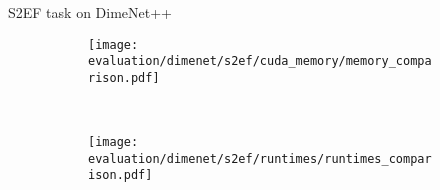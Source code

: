 \begin{frame}{S2EF task on DimeNet++}
    
    \begin{figure}[H]
        \centering
    
        \begin{subfigure}[t]{0.48\textwidth}
            \centering
            \texttt{[image: evaluation/dimenet/s2ef/cuda\_memory/memory\_comparison.pdf]}
        \end{subfigure}%
        ~
        \begin{subfigure}[t]{0.48\textwidth}
            \centering
            \texttt{[image: evaluation/dimenet/s2ef/runtimes/runtimes\_comparison.pdf]}
        \end{subfigure}
    
        \vspace*{-0.5em}
    

\end{figure}
\end{frame}
